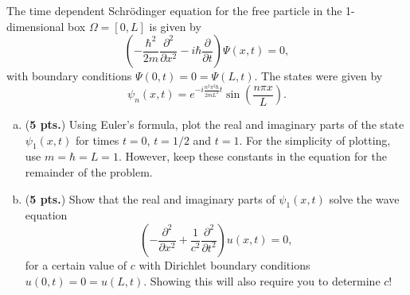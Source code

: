 \documentclass[12pt]{amsbook}
\begin{document}
\newpage
\begin{problem}
The time dependent Schr\"odinger equation for the free particle in the 1-dimensional box $\Omega = [0,L]$ is given by
\[
\left(-\frac{\hbar^2}{2m} \frac{\partial^2}{\partial x^2} - i\hbar \frac{\partial}{\partial t} \right) \Psi(x,t) = 0,
\]     
with boundary conditions $\Psi(0,t)=0=\Psi(L,t)$. The states were given by
\[
\psi_n(x,t) = e^{-i \frac{n^2 \pi^2 \hbar}{2mL^2} t} \sin\left(\frac{n \pi x}{L}\right).
\]


\vspace*{.5cm}
   \begin{enumerate}[(a)]
        \item (\textbf{5 pts.}) Using Euler's formula, plot the real and imaginary parts of the state $\psi_1(x,t)$ for times $t=0$, $t=1/2$ and $t=1$. For the simplicity of plotting, use $m=\hbar=L=1$. However, keep these constants in the equation for the remainder of the problem.
        \vspace*{.5cm}
        \item (\textbf{5 pts.}) Show that the real and imaginary parts of $\psi_1(x,t)$ solve the wave equation
        \[
        \left(-\frac{\partial^2}{\partial x^2} + \frac{1}{c^2} \frac{\partial^2}{\partial t^2} \right) u(x,t)=0,
        \]
        for a certain value of $c$ with Dirichlet boundary conditions $u(0,t)=0=u(L,t)$.  Showing this will also require you to determine $c$!
   \end{enumerate}
\end{problem}
\end{document}
